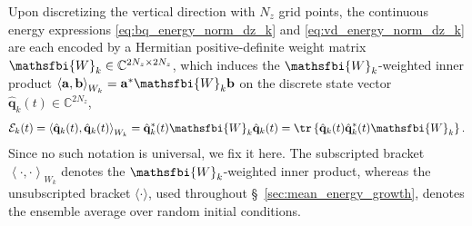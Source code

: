 Upon discretizing the vertical direction with \(N_z\) grid points, the continuous energy expressions \eqref{eq:bq_energy_norm_dz_k} and \eqref{eq:vd_energy_norm_dz_k} are each encoded by a Hermitian positive-definite weight matrix \(\mathsfbi{W}_{k}\in\mathbb{C}^{2N_z\times 2N_z}\), which induces the \(\mathsfbi{W}_k\)-weighted inner product \(\left\langle\mathbf{a},\mathbf{b}\right\rangle_{W_k}=\mathbf{a}^{*}\mathsfbi{W}_{k}\mathbf{b}\) on the discrete state vector \(\hat{\mathbf{q}}_k(t)\in\mathbb{C}^{2N_z}\),
\begin{equation}
    \mathcal{E}_k(t)
    =
    \left\langle\hat{\mathbf{q}}_k(t),\hat{\mathbf{q}}_k(t)\right\rangle_{W_k}
    =
    \hat{\mathbf{q}}_k^{*}(t)\mathsfbi{W}_{k}\hat{\mathbf{q}}_k(t)
    =
    \tr
    \left\{
      \hat{\mathbf{q}}_k(t)\hat{\mathbf{q}}_k^{*}(t)\mathsfbi{W}_{k}
    \right\}.
    \label{eq:instantaneous_energy}
\end{equation}
Since no such notation is universal, we fix it here. The subscripted bracket \(\left\langle\cdot,\cdot\right\rangle_{W_k}\) denotes the \(\mathsfbi{W}_k\)-weighted inner product, whereas the unsubscripted bracket \(\langle\cdot\rangle\), used throughout \S~\ref{sec:mean_energy_growth}, denotes the ensemble average over random initial conditions.

